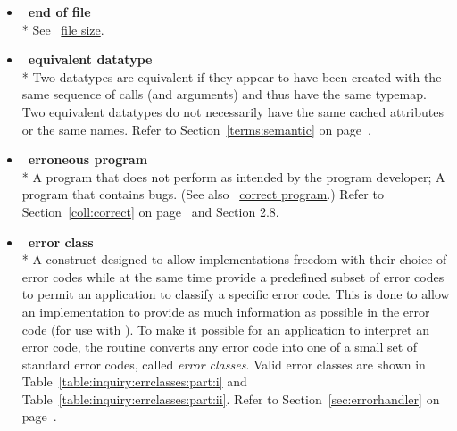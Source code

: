 \begin{itemize}
\label{glossary:end_of_file}
\item  ~\hypertarget{glossary:end_of_file}{\textbf{end of file}} \\*
See ~\hyperlink{glossary:file_size}{file size}.

\label{glossary:equivalent_datatype}
\item  ~\hypertarget{glossary:equivalent_datatype}{\textbf{equivalent datatype}} \\*
Two datatypes are equivalent if they appear to have been created with
the same sequence of calls (and arguments) and thus have the same
typemap.  Two equivalent datatypes do not necessarily have the same
cached attributes or the same names.
Refer to Section~\ref{terms:semantic} on page~\pageref{terms:semantic}.

\label{glossary:erroneous_program}
\item  ~\hypertarget{glossary:erroneous_program}{\textbf{erroneous program}} \\*
A program that does not perform as intended by the program developer; A program that contains bugs. 
(See also ~\hyperlink{glossary:correct_program}{correct program}.)
Refer to Section~\ref{coll:correct} on page~\pageref{coll:correct} and
Section 2.8.

\label{glossary:error_class}
\item  ~\hypertarget{glossary:error_class}{\textbf{error class}} \\*
A construct designed to allow implementations freedom with their choice
of error codes while at the same time provide a predefined subset of error
codes to permit an application to classify a specific error code.
This is done to allow an implementation to
provide as much information as possible in the error code (for use with
).
To make it possible for an application to interpret an error code, the routine
converts any error code into one of a small set of standard error
codes, called {\em error classes}.  
Valid error classes are shown in Table~\ref{table:inquiry:errclasses:part:i}
and Table~\ref{table:inquiry:errclasses:part:ii}. 
Refer to Section~\ref{sec:errorhandler} on page~\pageref{sec:errorhandler}.


\end{itemize}
